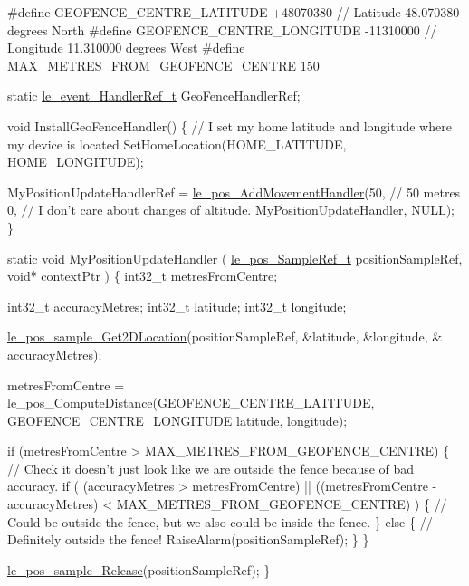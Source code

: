 \begin{DoxyCode}
\textcolor{preprocessor}{#define GEOFENCE\_CENTRE\_LATITUDE            +48070380  // Latitude 48.070380 degrees North}
\textcolor{preprocessor}{#define GEOFENCE\_CENTRE\_LONGITUDE           -11310000  // Longitude 11.310000 degrees West}
\textcolor{preprocessor}{#define MAX\_METRES\_FROM\_GEOFENCE\_CENTRE     150}

\textcolor{keyword}{static} \hyperlink{le__event_loop_8h_ae7ab96b8e3441b3d484fcf52aa7a9dad}{le\_event\_HandlerRef\_t} GeoFenceHandlerRef;

\textcolor{keywordtype}{void} InstallGeoFenceHandler()
\{
    \textcolor{comment}{// I set my home latitude and longitude where my device is located}
    SetHomeLocation(HOME\_LATITUDE, HOME\_LONGITUDE);

    MyPositionUpdateHandlerRef = \hyperlink{le__pos__interface_8h_a17e99072772110c1609c53247d663ed3}{le\_pos\_AddMovementHandler}(50, \textcolor{comment}{// 50 metres}
                                                           0,  \textcolor{comment}{// I don't care about changes of altitude.}
                                                           MyPositionUpdateHandler,
                                                           NULL);
\}


\textcolor{keyword}{static} \textcolor{keywordtype}{void} MyPositionUpdateHandler
(
    \hyperlink{le__pos__interface_8h_a69a38f7e650f581bb5e2b5ce7e339202}{le\_pos\_SampleRef\_t}     positionSampleRef,
    \textcolor{keywordtype}{void}*                  contextPtr
)
\{
    int32\_t metresFromCentre;

    int32\_t accuracyMetres;
    int32\_t latitude;
    int32\_t longitude;

    \hyperlink{le__pos__interface_8h_ae7b3b16601465b663b468f12c63ea485}{le\_pos\_sample\_Get2DLocation}(positionSampleRef, &latitude, &longitude, &
      accuracyMetres);

    metresFromCentre = le\_pos\_ComputeDistance(GEOFENCE\_CENTRE\_LATITUDE, GEOFENCE\_CENTRE\_LONGITUDE
                                              latitude, longitude);

    \textcolor{keywordflow}{if} (metresFromCentre > MAX\_METRES\_FROM\_GEOFENCE\_CENTRE)
    \{
        \textcolor{comment}{// Check it doesn't just look like we are outside the fence because of bad accuracy.}
        \textcolor{keywordflow}{if} (  (accuracyMetres > metresFromCentre) ||
              ((metresFromCentre - accuracyMetres) < MAX\_METRES\_FROM\_GEOFENCE\_CENTRE)  )
        \{
            \textcolor{comment}{// Could be outside the fence, but we also could be inside the fence.}
        \}
        \textcolor{keywordflow}{else}
        \{
            \textcolor{comment}{// Definitely outside the fence!}
            RaiseAlarm(positionSampleRef);
        \}
    \}

    \hyperlink{le__pos__interface_8h_af2999e2e4f7eca899b2af1125547e3ea}{le\_pos\_sample\_Release}(positionSampleRef);
\}
\end{DoxyCode}
